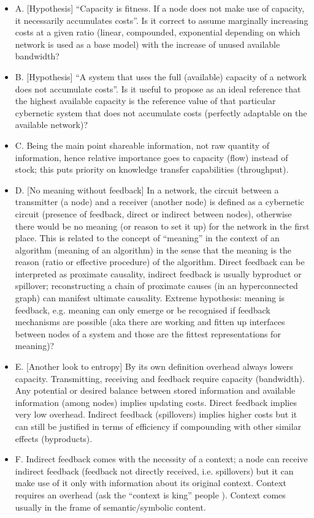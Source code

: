 \documentclass[14pt]{extarticle}
\begin{document}
\begin{itemize}
\item A. [Hypothesis] “Capacity is fitness. If a node does not make use of capacity, it necessarily accumulates costs”. Is it correct to assume marginally increasing costs at a given ratio (linear, compounded, exponential depending on which network is used as a base model) with the increase of unused available bandwidth?
\item B. [Hypothesis] “A system that uses the full (available) capacity of a network does not accumulate costs”. Is it useful to propose as an ideal reference that the highest available capacity is the reference value of that particular cybernetic system that does not accumulate costs (perfectly adaptable on the available network)?
\item C. Being the main point shareable information, not raw quantity of information, hence relative importance goes to capacity (flow) instead of stock; this puts priority on knowledge transfer capabilities (throughput).
\item D. [No meaning without feedback] In a network, the circuit between a transmitter (a node) and a receiver (another node) is defined as a cybernetic circuit (presence of feedback, direct or indirect between nodes), otherwise there would be no meaning (or reason to set it up) for the network in the first place. This is related to the concept of “meaning” in the context of an algorithm (meaning of an algorithm) in the sense that the meaning is the reason (ratio or effective procedure) of the algorithm. Direct feedback can be interpreted as proximate causality, indirect feedback is usually byproduct or spillover; reconstructing a chain of proximate causes (in an hyperconnected graph) can manifest ultimate causality. Extreme hypothesis: meaning is feedback, e.g. meaning can only emerge or be recognised if feedback mechanisms are possible (aka there are working and fitten up interfaces between nodes of a system and those are the fittest representations for meaning)? 
\item E. [Another look to entropy] By its own definition overhead always lowers capacity. Transmitting, receiving and feedback require capacity (bandwidth). Any potential or desired balance between stored information and available information (among nodes) implies updating costs. Direct feedback implies very low overhead. Indirect feedback (spillovers) implies higher costs but it can still be justified in terms of efficiency if compounding with other similar effects (byproducts).
\item F. Indirect feedback comes with the necessity of a context; a node can receive indirect feedback (feedback not directly received, i.e. spillovers) but it can make use of it only with information about its original context. Context requires an overhead (ask the “context is king” people \cite{doi:10.1057}). Context comes usually in the frame of semantic/symbolic content.
\end{itemize}
\end{document}
